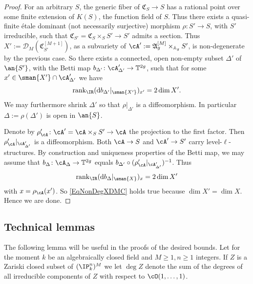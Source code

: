 \begin{proof}

For an arbitrary $S$, the generic fiber of $\mathfrak{C}_S \rightarrow
S$ has a rational point over some finite extension of $K(S)$, the
function field of $S$. Thus there exists a quasi-finite \'{e}tale
dominant (not necessarily surjective) morphism $\rho \colon S'
\rightarrow S$, with $S'$ irreducible, such that $\mathfrak{C}_{S'} = \mathfrak{C}_S \times_S
S' \rightarrow S'$ admits a section. Thus $X' :=
\mathscr{D}_M(\mathfrak{C}_{S'}^{[M+1]})$, as a subvariety of
$\cA':=\mathfrak{A}_g^{[M]}\times_{\mathbb{A}_g} S'$,  is
non-degenerate by the previous case. So there exists a connected, open non-empty subset $\Delta'$ of $\an{S'}$, with the Betti map $b_{\Delta'} \colon \cA'_{\Delta'} \rightarrow \mathbb{T}^{2g}$, such that for some $x' \in \sman{X'} \cap \cA'_{\Delta'}$ we have
\[
\mathrm{rank}_{\IR} (\mathrm{d}b_{\Delta'}|_{\sman{X'}})_{x'} = 2\dim X'.
\]
We may furthermore shrink $\Delta'$ so that $\rho|_{\Delta'}$ is a diffeomorphism. In particular $\Delta:=\rho(\Delta')$ is open in $\an{S}$.

Denote by $\rho'_{\cA} \colon \cA' = \cA\times_S S' \rightarrow \cA$
the projection to the first factor. Then
$\rho'_{\cA}|_{\cA'_{\Delta'}}$ is a diffeomorphism. Both $\cA
\rightarrow S$ and $\cA' \rightarrow S'$ carry
level-$\ell$-structures. By construction and uniqueness properties of
the Betti map, we may assume that $b_{\Delta} \colon \cA_{\Delta} \rightarrow \mathbb{T}^{2g}$ equals $b_{\Delta'} \circ  (\rho'_{\cA}|_{\cA'_{\Delta'}})^{-1}$. Thus
\[
\mathrm{rank}_{\IR} (\mathrm{d}b_{\Delta}|_{\sman{X}})_{x} = 2\dim X'
\]
with $x = \rho_{\cA}(x')$. So \eqref{EqNonDegXDMC} holds true because $\dim X' = \dim X$. Hence we are done.
\end{proof}



\subsection{Technical lemmas}


The following lemma will be useful in the proofs of the desired
bounds. Let for the moment $k$ be an algebraically closed field and
$M\ge 1,n\ge 1$ integers. If $Z$ is a Zariski closed subset of $(\IP_k^n)^M$
we let $\deg Z$ denote the sum of the degrees of all irreducible
components of $Z$ with respect to $\cO(1,\ldots,1)$.

